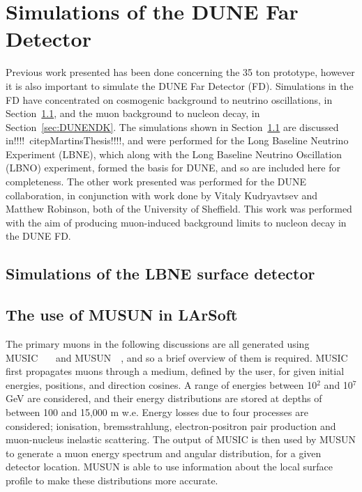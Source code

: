 
\chapter{Simulations of the DUNE Far Detector}  %
\graphicspath{{FarDetectorSimulations/Figs/Raster/}{FarDetectorSimulations/Figs/PDF/}{FarDetectorSimulations/Figs/}}

Previous work presented has been done concerning the 35 ton prototype, however it is also important to simulate the DUNE Far Detector (FD). Simulations in the FD have concentrated on cosmogenic background to neutrino oscillations, in Section~\ref{sec:LBNESurf}, and the muon background to nucleon decay, in Section~\ref{sec:DUNENDK}. The simulations shown in Section~\ref{sec:LBNESurf} are discussed in!!!!~citep{MartinsThesis}!!!!, and were performed for the Long Baseline Neutrino Experiment (LBNE), which along with the Long Baseline Neutrino Oscillation (LBNO) experiment, formed the basis for DUNE, and so are included here for completeness. The other work presented was performed for the DUNE collaboration, in conjunction with work done by Vitaly Kudryavtsev and Matthew Robinson, both of the University of Sheffield. This work was performed with the aim of producing muon-induced background limits to nucleon decay in the DUNE FD. \\

\section{Simulations of the LBNE surface detector} \label{sec:LBNESurf} %

\section{The use of MUSUN in LArSoft} \label{sec:FDIncorporation}  %
The primary muons in the following discussions are all generated using MUSIC~\citep{MUSUN}~\citep{MUSIC}~\citep{MUSIC2} and MUSUN~\citep{MUSUN}~\citep{MUSUN2}, and so a brief overview of them is required. MUSIC first propagates muons through a medium, defined by the user, for given initial energies, positions, and direction cosines. A range of energies between 10$^2$ and 10$^7$ GeV are considered, and their energy distributions are stored at depths of between 100 and 15,000 m w.e. Energy losses due to four processes are considered; ionisation, bremsstrahlung, electron-positron pair production and muon-nucleus inelastic scattering. The output of MUSIC is then used by MUSUN to generate a muon energy spectrum and angular distribution, for a given detector location. MUSUN is able to use information about the local surface profile to make these distributions more accurate. \\

